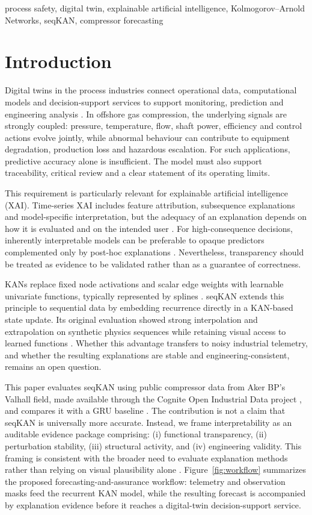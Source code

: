 \documentclass[conference]{IEEEtran}
\begin{document}
\begin{IEEEkeywords}
process safety, digital twin, explainable artificial intelligence, Kolmogorov--Arnold Networks, seqKAN, compressor forecasting
\end{IEEEkeywords}

\section{Introduction}
Digital twins in the process industries connect operational data, computational models and decision-support services to support monitoring, prediction and engineering analysis \cite{perno2022,peterson2025}. In offshore gas compression, the underlying signals are strongly coupled: pressure, temperature, flow, shaft power, efficiency and control actions evolve jointly, while abnormal behaviour can contribute to equipment degradation, production loss and hazardous escalation. For such applications, predictive accuracy alone is insufficient. The model must also support traceability, critical review and a clear statement of its operating limits.

This requirement is particularly relevant for explainable artificial intelligence (XAI). Time-series XAI includes feature attribution, subsequence explanations and model-specific interpretation, but the adequacy of an explanation depends on how it is evaluated and on the intended user \cite{theissler2022}. For high-consequence decisions, inherently interpretable models can be preferable to opaque predictors complemented only by post-hoc explanations \cite{rudin2019}. Nevertheless, transparency should be treated as evidence to be validated rather than as a guarantee of correctness.

KANs replace fixed node activations and scalar edge weights with learnable univariate functions, typically represented by splines \cite{liu2024}. seqKAN extends this principle to sequential data by embedding recurrence directly in a KAN-based state update. Its original evaluation showed strong interpolation and extrapolation on synthetic physics sequences while retaining visual access to learned functions \cite{boura2025}. Whether this advantage transfers to noisy industrial telemetry, and whether the resulting explanations are stable and engineering-consistent, remains an open question.

This paper evaluates seqKAN using public compressor data from Aker BP's Valhall field, made available through the Cognite Open Industrial Data project \cite{cognite2018}, and compares it with a GRU baseline \cite{cho2014}. The contribution is not a claim that seqKAN is universally more accurate. Instead, we frame interpretability as an auditable evidence package comprising: (i) functional transparency, (ii) perturbation stability, (iii) structural activity, and (iv) engineering validity. This framing is consistent with the broader need to evaluate explanation methods rather than relying on visual plausibility alone \cite{adebayo2018}. Figure~\ref{fig:workflow} summarizes the proposed forecasting-and-assurance workflow: telemetry and observation masks feed the recurrent KAN model, while the resulting forecast is accompanied by explanation evidence before it reaches a digital-twin decision-support service.
\end{document}
